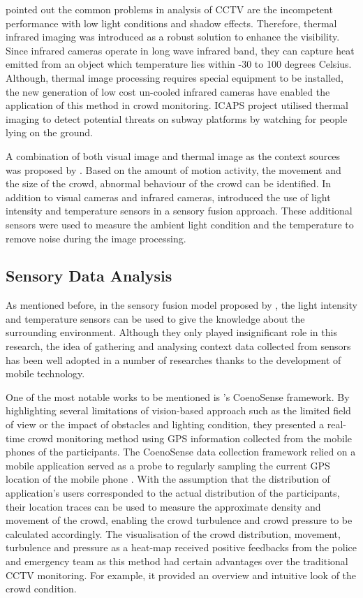 \textcite{Andersson2009} pointed out the common problems in analysis of CCTV are the incompetent performance with low light conditions and shadow effects. Therefore, thermal infrared imaging was introduced as a robust solution to enhance the visibility. Since infrared cameras operate in long wave infrared band, they can capture heat emitted from an object which temperature lies within -30 to 100 degrees Celsius. Although, thermal image processing requires special equipment to be installed, the new generation of low cost un-cooled infrared cameras have enabled the application of this method in crowd monitoring. ICAPS project \parencite{Pham2007} utilised thermal imaging to detect potential threats on subway platforms by watching for people lying on the ground.

A combination of both visual image and thermal image as the context sources was proposed by \textcite{Andersson2009}. Based on the amount of motion activity, the movement and the size of the crowd, abnormal behaviour of the crowd can be identified. In addition to visual cameras and infrared cameras, \textcite{Yaseen2013} introduced the use of light intensity and temperature sensors in a sensory fusion approach. These additional sensors were used to measure the ambient light condition and the temperature to remove noise during the image processing.

\subsection{Sensory Data Analysis}
As mentioned before, in the sensory fusion model proposed by \textcite{Yaseen2013}, the light intensity and temperature sensors can be used to give the knowledge about the surrounding environment. Although they only played insignificant role in this research, the idea of gathering and analysing context data collected from sensors has been well adopted in a number of researches thanks to the development of mobile technology.

One of the most notable works to be mentioned is \textcite{Wirz2012}’s CoenoSense framework. By highlighting several limitations of vision-based approach such as the limited field of view or the impact of obstacles and lighting condition, they presented a real-time crowd monitoring method using GPS information collected from the mobile phones of the participants. The CoenoSense data collection framework relied on a mobile application served as a probe to regularly sampling the current GPS location of the mobile phone \parencite{Wirz2013}. With the assumption that the distribution of application's users corresponded to the actual distribution of the participants, their location traces can be used to measure the approximate density and movement of the crowd, enabling the crowd turbulence and crowd pressure to be calculated accordingly. The visualisation of the crowd distribution, movement, turbulence and pressure as a heat-map received positive feedbacks from the police and emergency team as this method had certain advantages over the traditional CCTV monitoring. For example, it provided an overview and intuitive look of the crowd condition.

